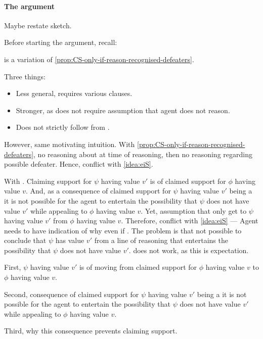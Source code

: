 \paragraph{The argument}

\begin{note}
  \color{red}
  Maybe restate sketch.
\end{note}

\begin{note}
  Before starting the argument, recall:
  \begin{quote}
    \vspace{-\baselineskip}
    \propRecogniseDefeaters*
  \end{quote}
  \nI{} is a variation of \autoref{prop:CS-only-if-reason-recognised-defeaters}.

  Three things:
  \begin{itemize}
  \item Less general, requires various clauses.
  \item Stronger, as does not require assumption that agent does not reason.
  \item Does not strictly follow from \requ{}.
  \end{itemize}

  However, same motivating intuition.
  With \autoref{prop:CS-only-if-reason-recognised-defeaters}, no reasoning about \requ{} at time of reasoning, then no reasoning regarding possible defeater.
  Hence, conflict with \autoref{idea:eiS}.

  With \nI{}.
  Claiming support for \(\psi\) having value \(v'\) is \requ{} of claimed support for \(\phi\) having value \(v\).
  And, as a consequence of claimed support for \(\psi\) having value \(v'\) being a \requ{} it is not possible for the agent to entertain the possibility that \(\psi\) does not have value \(v'\) while appealing to \(\phi\) having value \(v\).
  Yet, assumption that only get to \(\psi\) having value \(v'\) from \(\phi\) having value \(v\).
  Therefore, conflict with \autoref{idea:eiS} --- Agent needs to have indication of why even if \mom{}.
  The problem is that not possible to conclude that \(\psi\) has value \(v'\) from a line of reasoning that entertains the possibility that \(\psi\) does not have value \(v'\).
  \requ{} does not work, as this is expectation.
\end{note}

\begin{note}
  First, \(\psi\) having value \(v'\) is \requ{} of moving from claimed support for \(\phi\) having value \(v\) to \(\phi\) having value \(v\).

  Second, consequence of claimed support for \(\psi\) having value \(v'\) being a \requ{} it is not possible for the agent to entertain the possibility that \(\psi\) does not have value \(v'\) while appealing to \(\phi\) having value \(v\).

  Third, why this consequence prevents claiming support.
\end{note}

